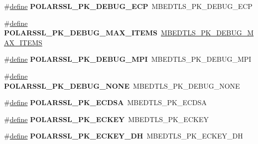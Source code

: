 \begin{DoxyCompactItemize}
\item 
\mbox{\label{compat-1_83_8h_a5098a0902ddb17d81f7bde19979e901b}} 
\#\hyperlink{structdefine}{define} {\bfseries P\+O\+L\+A\+R\+S\+S\+L\+\_\+\+P\+K\+\_\+\+D\+E\+B\+U\+G\+\_\+\+E\+CP}~M\+B\+E\+D\+T\+L\+S\+\_\+\+P\+K\+\_\+\+D\+E\+B\+U\+G\+\_\+\+E\+CP
\item 
\mbox{\label{compat-1_83_8h_a2565c73cdb12cc77e552cd3ed5a80960}} 
\#\hyperlink{structdefine}{define} {\bfseries P\+O\+L\+A\+R\+S\+S\+L\+\_\+\+P\+K\+\_\+\+D\+E\+B\+U\+G\+\_\+\+M\+A\+X\+\_\+\+I\+T\+E\+MS}~\hyperlink{pk_8h_a73c1247ff4513b853b61b0dc36b69892}{M\+B\+E\+D\+T\+L\+S\+\_\+\+P\+K\+\_\+\+D\+E\+B\+U\+G\+\_\+\+M\+A\+X\+\_\+\+I\+T\+E\+MS}
\item 
\mbox{\label{compat-1_83_8h_a3482006d64fdf9c4320a3dd3fc18765b}} 
\#\hyperlink{structdefine}{define} {\bfseries P\+O\+L\+A\+R\+S\+S\+L\+\_\+\+P\+K\+\_\+\+D\+E\+B\+U\+G\+\_\+\+M\+PI}~M\+B\+E\+D\+T\+L\+S\+\_\+\+P\+K\+\_\+\+D\+E\+B\+U\+G\+\_\+\+M\+PI
\item 
\mbox{\label{compat-1_83_8h_af9201f1c33c9b1a3ee3d083e87442ffd}} 
\#\hyperlink{structdefine}{define} {\bfseries P\+O\+L\+A\+R\+S\+S\+L\+\_\+\+P\+K\+\_\+\+D\+E\+B\+U\+G\+\_\+\+N\+O\+NE}~M\+B\+E\+D\+T\+L\+S\+\_\+\+P\+K\+\_\+\+D\+E\+B\+U\+G\+\_\+\+N\+O\+NE
\item 
\mbox{\label{compat-1_83_8h_af093d558576b401965446719d746f0d4}} 
\#\hyperlink{structdefine}{define} {\bfseries P\+O\+L\+A\+R\+S\+S\+L\+\_\+\+P\+K\+\_\+\+E\+C\+D\+SA}~M\+B\+E\+D\+T\+L\+S\+\_\+\+P\+K\+\_\+\+E\+C\+D\+SA
\item 
\mbox{\label{compat-1_83_8h_a1116c7a469468ab1e66a75108e1cbc35}} 
\#\hyperlink{structdefine}{define} {\bfseries P\+O\+L\+A\+R\+S\+S\+L\+\_\+\+P\+K\+\_\+\+E\+C\+K\+EY}~M\+B\+E\+D\+T\+L\+S\+\_\+\+P\+K\+\_\+\+E\+C\+K\+EY
\item 
\mbox{\label{compat-1_83_8h_a3b297724f2e067067b27608182f2b0c0}} 
\#\hyperlink{structdefine}{define} {\bfseries P\+O\+L\+A\+R\+S\+S\+L\+\_\+\+P\+K\+\_\+\+E\+C\+K\+E\+Y\+\_\+\+DH}~M\+B\+E\+D\+T\+L\+S\+\_\+\+P\+K\+\_\+\+E\+C\+K\+E\+Y\+\_\+\+DH
\item 
\mbox{\label{compat-1_83_8h_ab55c0c221c25b7b2fba3837c2cac8e38}} 

\end{DoxyCompactItemize}
